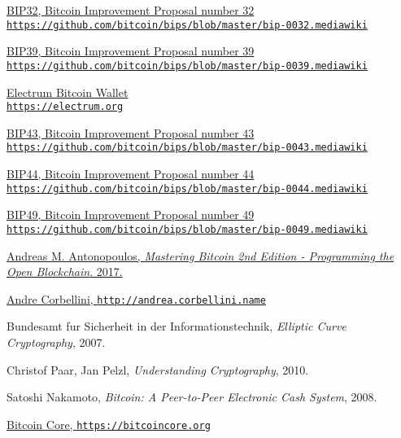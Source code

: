 \documentclass[
11pt, %
oneside, %
english, %
singlespacing, %
toctotoc, %
headsepline, %
]{MastersDoctoralThesis} %
\begin{document}
	
	
	
	
	\begin{thebibliography}{12}
		\href{https://github.com/bitcoin/bips/blob/master/bip-0032.mediawiki}{BIP32, Bitcoin Improvement Proposal number 32 \\ \texttt{https://github.com/bitcoin/bips/blob/master/bip-0032.mediawiki}}
		
		\href{https://github.com/bitcoin/bips/blob/master/bip-0039.mediawiki}{BIP39, Bitcoin Improvement Proposal number 39 \\ \texttt{https://github.com/bitcoin/bips/blob/master/bip-0039.mediawiki}}
		
		
		\href{https://electrum.org}{Electrum Bitcoin Wallet \\ \texttt{https://electrum.org}}
		
		\href{https://github.com/bitcoin/bips/blob/master/bip-0043.mediawiki}{BIP43, Bitcoin Improvement Proposal number 43 \\ \texttt{https://github.com/bitcoin/bips/blob/master/bip-0043.mediawiki}}

		\href{https://github.com/bitcoin/bips/blob/master/bip-0044.mediawiki}{BIP44, Bitcoin Improvement Proposal number 44 \\ \texttt{https://github.com/bitcoin/bips/blob/master/bip-0044.mediawiki}}
		
		\href{https://github.com/bitcoin/bips/blob/master/bip-0049.mediawiki}{BIP49, Bitcoin Improvement Proposal number 49 \\ \texttt{https://github.com/bitcoin/bips/blob/master/bip-0049.mediawiki}}
		
		\href{https://github.com/bitcoinbook/bitcoinbook}{Andreas M. Antonopoulos, \textit{Mastering Bitcoin 2nd Edition - Programming the Open Blockchain}. 2017.}
		
		\href{http://andrea.corbellini.name}{Andre Corbellini, \texttt{http://andrea.corbellini.name}}
		
		Bundesamt fur Sicherheit in der Informationstechnik, \textit{Elliptic Curve Cryptography}, 2007.
		
		Christof Paar, Jan Pelzl, \textit{Understanding Cryptography}, 2010.
		
		Satoshi Nakamoto, \textit{Bitcoin: A Peer-to-Peer Electronic Cash System}, 2008.
		
		\href{https://bitcoincore.org}{Bitcoin Core, \texttt{https://bitcoincore.org}}
		

	\end{thebibliography}

%
%
	
	\printbibliography[heading=bibintoc]
	
	
\end{document}

